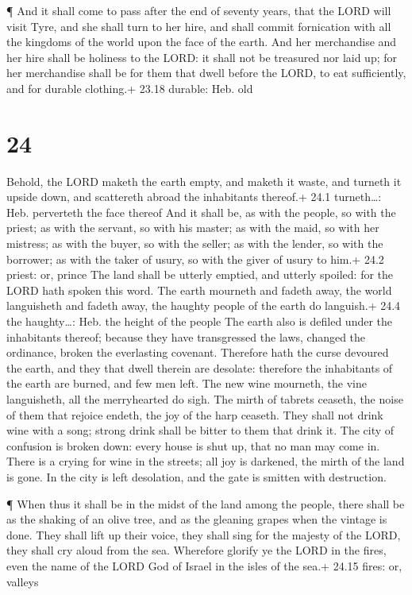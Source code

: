  ¶ And it shall come to pass after the end of seventy
years, that the LORD will visit Tyre, and she shall turn to her hire,
and shall commit fornication with all the kingdoms of the world upon the
face of the earth.  And her merchandise and her hire shall
be holiness to the LORD: it shall not be treasured nor laid up; for her
merchandise shall be for them that dwell before the LORD, to eat
sufficiently, and for durable clothing.+ 23.18 durable: Heb. old

\hypertarget{section-23}{%
\section{24}\label{section-23}}

 Behold, the LORD maketh the earth empty, and maketh it
waste, and turneth it upside down, and scattereth abroad the inhabitants
thereof.+ 24.1 turneth\ldots: Heb. perverteth the face thereof
 And it shall be, as with the people, so with the priest; as
with the servant, so with his master; as with the maid, so with her
mistress; as with the buyer, so with the seller; as with the lender, so
with the borrower; as with the taker of usury, so with the giver of
usury to him.+ 24.2 priest: or, prince  The land shall be
utterly emptied, and utterly spoiled: for the LORD hath spoken this
word.  The earth mourneth and fadeth away, the world
languisheth and fadeth away, the haughty people of the earth do
languish.+ 24.4 the haughty\ldots: Heb. the height of the people
 The earth also is defiled under the inhabitants thereof;
because they have transgressed the laws, changed the ordinance, broken
the everlasting covenant.  Therefore hath the curse devoured
the earth, and they that dwell therein are desolate: therefore the
inhabitants of the earth are burned, and few men left.  The
new wine mourneth, the vine languisheth, all the merryhearted do sigh.
 The mirth of tabrets ceaseth, the noise of them that
rejoice endeth, the joy of the harp ceaseth.  They shall not
drink wine with a song; strong drink shall be bitter to them that drink
it.  The city of confusion is broken down: every house is
shut up, that no man may come in.  There is a crying for
wine in the streets; all joy is darkened, the mirth of the land is gone.
 In the city is left desolation, and the gate is smitten
with destruction.

 ¶ When thus it shall be in the midst of the land among the
people, there shall be as the shaking of an olive tree, and as the
gleaning grapes when the vintage is done.  They shall lift
up their voice, they shall sing for the majesty of the LORD, they shall
cry aloud from the sea.  Wherefore glorify ye the LORD in
the fires, even the name of the LORD God of Israel in the isles of the
sea.+ 24.15 fires: or, valleys

